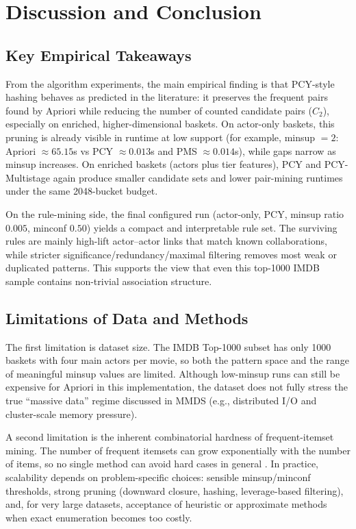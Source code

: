 \documentclass{article}  %
\begin{document}
\section{Discussion and Conclusion}

\subsection{Key Empirical Takeaways}

From the algorithm experiments, the main empirical finding is that PCY-style hashing behaves as predicted in the literature: it preserves the frequent pairs found by Apriori while reducing the number of counted candidate pairs (\(C_2\)), especially on enriched, higher-dimensional baskets. On actor-only baskets, this pruning is already visible in runtime at low support (for example, minsup \(=2\): Apriori \(\approx 65.15\)s vs PCY \(\approx 0.013\)s and PMS \(\approx 0.014\)s), while gaps narrow as minsup increases. On enriched baskets (actors plus tier features), PCY and PCY-Multistage again produce smaller candidate sets and lower pair-mining runtimes under the same 2048-bucket budget.

On the rule-mining side, the final configured run (actor-only, PCY, minsup ratio \(0.005\), minconf \(0.50\)) yields a compact and interpretable rule set. The surviving rules are mainly high-lift actor--actor links that match known collaborations, while stricter significance/redundancy/maximal filtering removes most weak or duplicated patterns. This supports the view that even this top-1000 IMDB sample contains non-trivial association structure.

\subsection{Limitations of Data and Methods}

The first limitation is dataset size. The IMDB Top-1000 subset has only 1000 baskets with four main actors per movie, so both the pattern space and the range of meaningful minsup values are limited. Although low-minsup runs can still be expensive for Apriori in this implementation, the dataset does not fully stress the true ``massive data'' regime discussed in MMDS (e.g., distributed I/O and cluster-scale memory pressure).

A second limitation is the inherent combinatorial hardness of frequent-itemset mining. The number of frequent itemsets can grow exponentially with the number of items, so no single method can avoid hard cases in general \cite{aroraComputationalComplexityModern2009}. In practice, scalability depends on problem-specific choices: sensible minsup/minconf thresholds, strong pruning (downward closure, hashing, leverage-based filtering), and, for very large datasets, acceptance of heuristic or approximate methods when exact enumeration becomes too costly.
\end{document}
